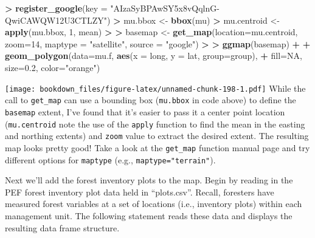 \documentclass[]{krantz}
\makeatletter
\newenvironment{Shaded}{\begin{snugshade}}{\end{snugshade}}
\newcommand{\KeywordTok}[1]{\textcolor[rgb]{0.27,0.27,0.27}{\textbf{#1}}}
\newcommand{\DataTypeTok}[1]{\textcolor[rgb]{0.27,0.27,0.27}{#1}}
\newcommand{\DecValTok}[1]{\textcolor[rgb]{0.06,0.06,0.06}{#1}}
\newcommand{\FloatTok}[1]{\textcolor[rgb]{0.06,0.06,0.06}{#1}}
\newcommand{\StringTok}[1]{\textcolor[rgb]{0.5,0.5,0.5}{#1}}
\newcommand{\OtherTok}[1]{\textcolor[rgb]{0.37,0.37,0.37}{#1}}
\newcommand{\OperatorTok}[1]{\textcolor[rgb]{0.43,0.43,0.43}{\textbf{#1}}}
\newcommand{\ErrorTok}[1]{\textcolor[rgb]{0.14,0.14,0.14}{\textbf{#1}}}
\newcommand{\NormalTok}[1]{#1}
\newenvironment{kframe}{%
\medskip{}
\setlength{\fboxsep}{.8em}
 \def\at@end@of@kframe{}%
 \ifinner\ifhmode%
  \def\at@end@of@kframe{\end{minipage}}%
  \begin{minipage}{\columnwidth}%
 \fi\fi%
 \def\FrameCommand##1{\hskip\@totalleftmargin \hskip-\fboxsep
 \colorbox{shadecolor}{##1}\hskip-\fboxsep
     \hskip-\linewidth \hskip-\@totalleftmargin \hskip\columnwidth}%
 \MakeFramed {\advance\hsize-\width
   \@totalleftmargin\z@ \linewidth\hsize
   \@setminipage}}%
 {\par\unskip\endMakeFramed%
 \at@end@of@kframe}
\renewenvironment{Shaded}{\begin{kframe}}{\end{kframe}}
\makeatother
\begin{document}
\begin{Shaded}
\begin{Highlighting}[]
\OperatorTok{>}\StringTok{ }\KeywordTok{register_google}\NormalTok{(}\DataTypeTok{key =} \StringTok{"AIzaSyBPAwSY5x8vQqlnG-QwiCAWQW12U3CTLZY"}\NormalTok{)}
\OperatorTok{>}\StringTok{ }\NormalTok{mu.bbox <-}\StringTok{ }\KeywordTok{bbox}\NormalTok{(mu)}
\OperatorTok{>}\StringTok{ }\NormalTok{mu.centroid <-}\StringTok{ }\KeywordTok{apply}\NormalTok{(mu.bbox, }\DecValTok{1}\NormalTok{, mean)}
\OperatorTok{>}\StringTok{ }
\ErrorTok{>}\StringTok{ }\NormalTok{basemap <-}\StringTok{ }\KeywordTok{get_map}\NormalTok{(}\DataTypeTok{location=}\NormalTok{mu.centroid, }\DataTypeTok{zoom=}\DecValTok{14}\NormalTok{, }\DataTypeTok{maptype =} \StringTok{"satellite"}\NormalTok{, }\DataTypeTok{source =} \StringTok{"google"}\NormalTok{)}
\OperatorTok{>}\StringTok{                                     }
\ErrorTok{>}\StringTok{ }\KeywordTok{ggmap}\NormalTok{(basemap) }\OperatorTok{+}\StringTok{ }
\OperatorTok{+}\StringTok{   }\KeywordTok{geom_polygon}\NormalTok{(}\DataTypeTok{data=}\NormalTok{mu.f, }\KeywordTok{aes}\NormalTok{(}\DataTypeTok{x =}\NormalTok{ long, }\DataTypeTok{y =}\NormalTok{ lat, }\DataTypeTok{group=}\NormalTok{group), }
\OperatorTok{+}\StringTok{                  }\DataTypeTok{fill=}\OtherTok{NA}\NormalTok{, }\DataTypeTok{size=}\FloatTok{0.2}\NormalTok{, }\DataTypeTok{color=}\StringTok{"orange"}\NormalTok{)}
\end{Highlighting}
\end{Shaded}

\texttt{[image: bookdown\_files/figure-latex/unnamed-chunk-198-1.pdf]}
While the call to \texttt{get\_map} can use a bounding box
(\texttt{mu.bbox} in code above) to define the \texttt{basemap} extent,
I've found that it's easier to pass it a center point location
(\texttt{mu.centroid} note the use of the \texttt{apply} function to
find the mean in the easting and northing extents) and \texttt{zoom}
value to extract the desired extent. The resulting map looks pretty
good! Take a look at the \texttt{get\_map} function manual page and try
different options for \texttt{maptype} (e.g.,
\texttt{maptype="terrain"}).

Next we'll add the forest inventory plots to the map. Begin by reading
in the PEF forest inventory plot data held in ``plots.csv''. Recall,
foresters have measured forest variables at a set of locations (i.e.,
inventory plots) within each management unit. The following statement
reads these data and displays the resulting data frame structure.
\end{document}
